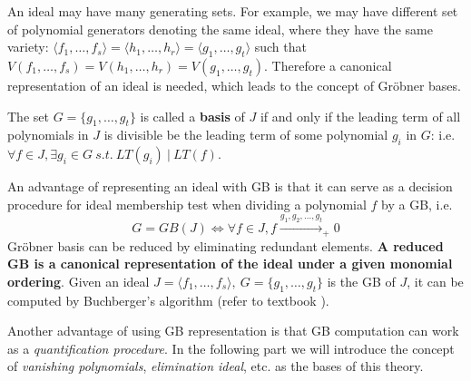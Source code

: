 An ideal may have many generating sets. For example, we may have different set of polynomial generators denoting
the same ideal, where they have the same variety: $\langle f_1,\dots,f_s\rangle = \langle h_1,\dots,h_r\rangle
= \langle g_1,\dots,g_t\rangle$ such that $V(f_1,\dots,f_s) = V(h_1,\dots,h_r) = V(g_1,\dots,g_t)$.
Therefore a canonical representation of an ideal is needed, which leads to the concept of Gr\"obner bases.

\begin{Definition}
The set $G = \{g_1, \dots,
g_t\}$ is called a \textbf{\Grobner basis} of $J$ if and only if the
leading term of all polynomials in $J$ is divisible be the leading
term of some polynomial $g_i$ in $G$: i.e. $\forall f \in J, \exists
g_i \in G \ s.t. \ LT(g_i) ~|~ LT(f)$. 
\end{Definition}

An advantage of representing an ideal with GB is that it can serve as a decision procedure for ideal membership
test when dividing a polynomial $f$ by a GB, i.e.
$$G = GB(J) \Longleftrightarrow \forall f\in J, f\xrightarrow{g_1,g_2,\dots,g_t}_{+} 0$$
Gr\"obner basis can be reduced by eliminating redundant elements. \textbf{A reduced GB is a canonical representation of 
the ideal under a given monomial ordering}. Given an ideal $J = \langle f_1,\dots,f_s\rangle, ~G = 
\{g_1,\dots,g_t\}$ is the GB of $J$, it can be computed by Buchberger's algorithm (refer to textbook \cite{ideal:book}).

Another advantage of using GB representation is that GB computation can work as a {\it quantification procedure}.
In the following part we will introduce the concept of \textit{vanishing polynomials}, \textit{elimination ideal}, etc.
as the bases of this theory.


